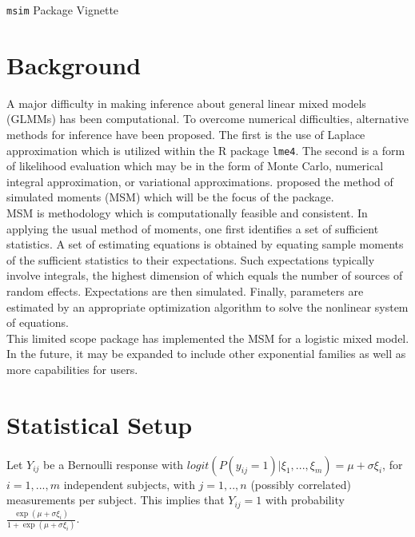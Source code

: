 \documentclass{article}\usepackage{graphicx, color}
\begin{document}
\begin{center}
\Large
{\tt msim} Package Vignette
\normalsize
\end{center}




\section{Background}
A major difficulty in making inference about general linear mixed models (GLMMs) has been computational. To overcome numerical difficulties, alternative methods for inference have been proposed.  The first is the use of Laplace approximation which is utilized within the R package {\tt lme4}.  The second is a form of likelihood evaluation which may be in the form of Monte Carlo, numerical integral approximation, or variational approximations.  \cite{jiang} proposed the method of simulated moments (MSM)  which will be the focus of the package.  \\

MSM is methodology which is computationally feasible and consistent.  In applying the usual method of moments, one first identifies a set of sufficient statistics. A set of estimating equations is obtained by equating sample moments of the sufficient statistics to their expectations. Such expectations typically involve integrals, the highest dimension of which equals the number of sources of random effects.  Expectations are then simulated.  Finally, parameters are estimated by an appropriate optimization algorithm to solve the nonlinear system of equations.\\

This limited scope package has implemented the MSM for a logistic mixed model.  In the future, it may be expanded to include other exponential families as well as more capabilities for users.\\

\section{Statistical Setup}

Let $Y_{ij}$ be a Bernoulli response with $logit(P(y_{ij}=1)|\xi_1,...,\xi_m)=\mu+ \sigma\xi_i$, for $i=1,...,m$ independent subjects, with $j=1,..,n$ (possibly correlated) measurements per subject.   This implies that $Y_{ij}=1$ with probability $\frac{\exp(\mu+\sigma\xi_i)}{1+\exp(\mu+\sigma\xi_i)}$.\\
\end{document}
